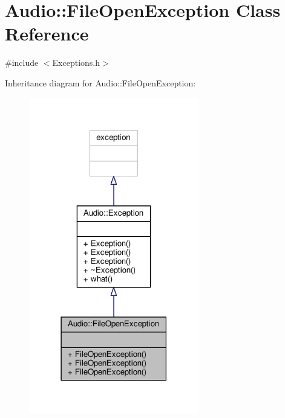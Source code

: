 \hypertarget{classAudio_1_1FileOpenException}{}\section{Audio\+:\+:File\+Open\+Exception Class Reference}
\label{classAudio_1_1FileOpenException}


{\ttfamily \#include $<$Exceptions.\+h$>$}



Inheritance diagram for Audio\+:\+:File\+Open\+Exception\+:
\nopagebreak
\begin{figure}[H]
\begin{center}
\leavevmode
\includegraphics[width=210pt]{d3/d1b/classAudio_1_1FileOpenException__inherit__graph}
\end{center}
\end{figure}


